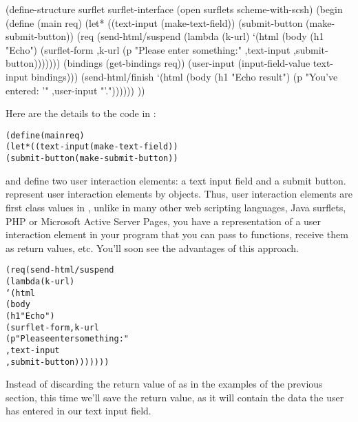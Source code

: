 \begin{listing}
(define-structure surflet surflet-interface
  (open surflets
        scheme-with-scsh)
  (begin
    (define (main req)
      (let* ((text-input (make-text-field))
             (submit-button (make-submit-button))
             (req (send-html/suspend
                   (lambda (k-url)
                     `(html 
                       (body 
                        (h1 "Echo")
                        (surflet-form ,k-url
                                      (p "Please enter something:"
                                         ,text-input
                                         ,submit-button)))))))
             (bindings (get-bindings req))
             (user-input (input-field-value text-input bindings)))
        (send-html/finish
         `(html (body
                 (h1 "Echo result")
                 (p "You've entered: '" ,user-input "'."))))))
))
\end{listing}

Here are the details to the code in :

\begin{alltt}
    (define (main req)
      (let* ((text-input (make-text-field))
             (submit-button (make-submit-button))
\end{alltt}

 and  define two user
interaction elements: a text input field and a submit button.
\surflets represent user interaction elements by 
objects.  Thus, user interaction elements are first class values in
\surflet, unlike in many other web scripting languages, \eg Java
surflets, PHP or Microsoft Active Server Pages, \ie you have a
representation of a user interaction element in your program that you
can pass to functions, receive them as return values, etc.  You'll
soon see the advantages of this approach.

\begin{alltt}
           (req (send-html/suspend
                 (lambda (k-url)
                   `(html 
                     (body 
                      (h1 "Echo")
                      (surflet-form ,k-url
                                    (p "Please enter something:"
                                       ,text-input
                                       ,submit-button)))))))
\end{alltt}

Instead of discarding the return value of  as
in the examples of the previous section, this time we'll save the
return value, as it will contain the data the user has entered in our
text input field.

